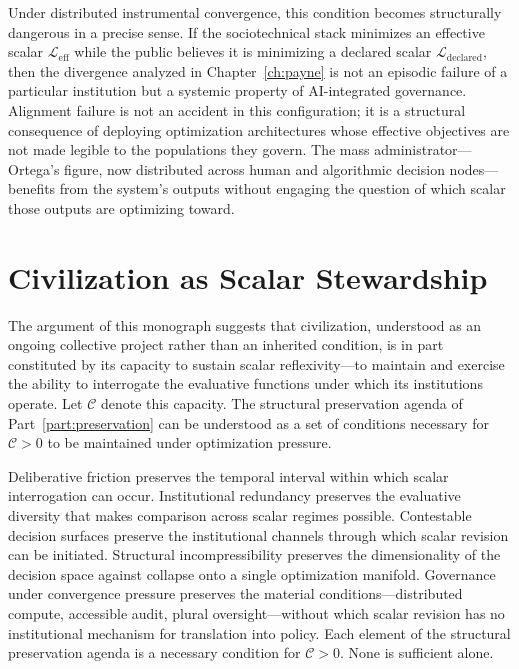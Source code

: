 \documentclass[12pt, oneside]{book}
\theoremstyle{plain}
\theoremstyle{definition}
\theoremstyle{remark}
\theoremstyle{definition}
\begin{document}
Under distributed instrumental convergence, this condition becomes structurally
dangerous in a precise sense. If the sociotechnical stack minimizes an effective
scalar $\mathcal{L}_{\text{eff}}$ while the public believes it is minimizing a
declared scalar $\mathcal{L}_{\text{declared}}$, then the divergence analyzed in
Chapter~\ref{ch:payne} is not an episodic failure of a particular institution but
a systemic property of AI-integrated governance. Alignment failure is not an
accident in this configuration; it is a structural consequence of deploying
optimization architectures whose effective objectives are not made legible to the
populations they govern. The mass administrator---Ortega's figure, now distributed
across human and algorithmic decision nodes---benefits from the system's outputs
without engaging the question of which scalar those outputs are optimizing toward.

\section{Civilization as Scalar Stewardship}

The argument of this monograph suggests that civilization, understood as an ongoing
collective project rather than an inherited condition, is in part constituted by its
capacity to sustain scalar reflexivity---to maintain and exercise the ability to
interrogate the evaluative functions under which its institutions operate. Let
$\mathcal{C}$ denote this capacity. The structural preservation agenda of
Part~\ref{part:preservation} can be understood as a set of conditions necessary for
$\mathcal{C} > 0$ to be maintained under optimization pressure.

Deliberative friction preserves the temporal interval within which scalar
interrogation can occur. Institutional redundancy preserves the evaluative diversity
that makes comparison across scalar regimes possible. Contestable decision surfaces
preserve the institutional channels through which scalar revision can be initiated.
Structural incompressibility preserves the dimensionality of the decision space
against collapse onto a single optimization manifold. Governance under convergence
pressure preserves the material conditions---distributed compute, accessible audit,
plural oversight---without which scalar revision has no institutional mechanism for
translation into policy. Each element of the structural preservation agenda is a
necessary condition for $\mathcal{C} > 0$. None is sufficient alone.
\end{document}
